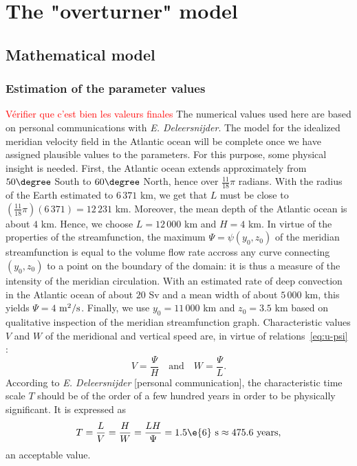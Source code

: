 \chapter{The "overturner" model}
\section{Mathematical model}
\subsection{Estimation of the parameter values}
\textcolor{red}{Vérifier que c'est bien les valeurs finales}
The numerical values used here are based on personal communications with \textit{E. Deleersnijder}.
The model for the idealized meridian velocity field in the Atlantic ocean will be complete once we have assigned plausible values to the parameters. For this purpose, some physical insight is needed. First, the Atlantic ocean extends approximately from $50\degree$ South to $60\degree$ North, hence over $\frac{11}{18}\pi$ radians. With the radius of the Earth estimated to $6\,371$ km, we get that $L$ must be close to $(\frac{11}{18}\pi) (6\,371) = 12\, 231$ km. Moreover, the mean depth of the Atlantic ocean is about $4$ km. Hence, we choose $L = 12\,000$ km and $H = 4$ km. In virtue of the properties of the streamfunction, the maximum $\Psi = \psi(y_0,z_0)$ of the meridian streamfunction is equal to the volume flow rate accross any curve connecting $(y_0,z_0)$ to a point on the boundary of the domain: it is thus a measure of the intensity of the meridian circulation. With an estimated rate of deep convection in the Atlantic ocean of about $20$ Sv and a mean width of about $5\,000$ km, this yields $\Psi = 4$ $\rm{m^2/s}$. Finally, we use $y_0 = 11\,000$ km and $z_0 = 3.5$ km based on qualitative inspection of the meridian streamfunction graph. Characteristic values $V$ and $W$ of the meridional and vertical speed are, in virtue of relations~\eqref{eq:u-psi} :
\begin{equation}\label{eq:VW}
	V = \frac{\Psi}{H} \quad \mbox{and} \quad W = \frac{\Psi}{L}.
\end{equation}
According to \textit{E. Deleersnijder} [personal communication], the characteristic time scale $T$ should be of the order of a few hundred years in order to be physically significant. It is expressed as
\begin{equation} \label{eq:T}
	T = \frac{L}{V} = \frac{H}{W} = \frac{LH}{\Psi} = 1.5\e{6} \mbox{ s} \approx 475.6 \mbox{ years},
\end{equation}
an acceptable value.

